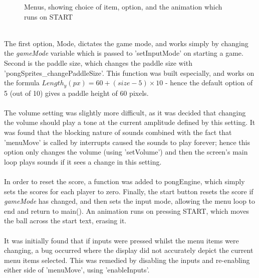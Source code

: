 \documentclass[a4paper,12pt]{article}
\begin{document}
\begin{flushleft}
\begin{figure}[H]
	\centering	{}
	\caption{Menus, showing choice of item, option, and the animation which runs on START}
\end{figure}
\- \\
The first option, Mode, dictates the game mode, and works simply by changing the \textit{gameMode} variable which is passed to 'setInputMode' on starting a game. Second is the paddle size, which changes the paddle size with 'pongSprites\_changePaddleSize'. This function was built especially, and works on the formula $Length_y (px) = 60+(size - 5)\times10$ - hence the default option of 5 (out of 10) gives a paddle height of 60 pixels.
\\ \- \\  
The volume setting was slightly more difficult, as it was decided that changing the volume should play a tone at the current amplitude defined by this setting. It was found that the blocking nature of sounds combined with the fact that 'menuMove' is called by interrupts caused the sounds to play forever; hence this option only changes the volume (using 'setVolume') and then the screen's main loop plays sounds if it sees a change in this setting.
\\ \- \\  
In order to reset the score, a function was added to pongEngine, which simply sets the scores for each player to zero. Finally, the start button resets the score if \textit{gameMode} has changed, and then sets the input mode, allowing the menu loop to end and return to main(). An animation runs on pressing START, which moves the ball across the start text, erasing it.
\\ \- \\  
It was initially found that if inputs were pressed whilst the menu items were changing, a bug occurred where the display did not accurately depict the current menu items selected. This was remedied by disabling the inputs and re-enabling either side of 'menuMove', using 'enableInputs'.
\end{flushleft}
\end{document}
